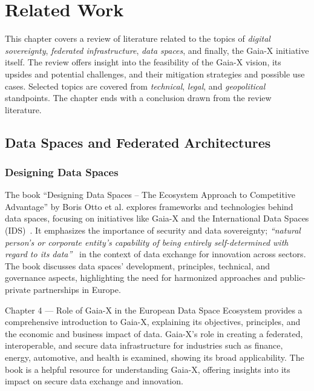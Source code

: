 \chapter{Related Work}\label{ch:related-work}

\begin{chapterabstract}
    This chapter covers a review of literature related to the topics of \textit{digital sovereignty}, \textit{federated infrastructure}, \textit{data spaces}, and finally, the Gaia-X initiative itself.
    The review offers insight into the feasibility of the Gaia-X vision, its upsides and potential challenges, and their mitigation strategies and possible use cases.
    Selected topics are covered from \textit{technical}, \textit{legal}, and \textit{geopolitical} standpoints.
    The chapter ends with a conclusion drawn from the review literature.
\end{chapterabstract}

\section{Data Spaces and Federated Architectures}\label{sec:data-spaces-and-federated-architectures}

\subsection{Designing Data Spaces}\label{subsec:designing-data-spaces}

The book ``Designing Data Spaces -- The Ecosystem Approach to Competitive Advantage'' by Boris Otto et al. explores frameworks and technologies behind data spaces, focusing on initiatives like Gaia-X and the International Data Spaces (IDS)~\cite{designing_dataspaces}.
It emphasizes the importance of security and data sovereignty; \textit{``natural person's or corporate entity's capability of being entirely self-determined with regard to its data''}~\cite{designing_dataspaces} in the context of data exchange for innovation across sectors.
The book discusses data spaces' development, principles, technical, and governance aspects, highlighting the need for harmonized approaches and public-private partnerships in Europe.

Chapter 4 --- Role of Gaia-X in the European Data Space Ecosystem provides a comprehensive introduction to Gaia-X, explaining its objectives, principles, and the economic and business impact of data.
Gaia-X's role in creating a federated, interoperable, and secure data infrastructure for industries such as finance, energy, automotive, and health is examined, showing its broad applicability.
The book is a helpful resource for understanding Gaia-X, offering insights into its impact on secure data exchange and innovation.

